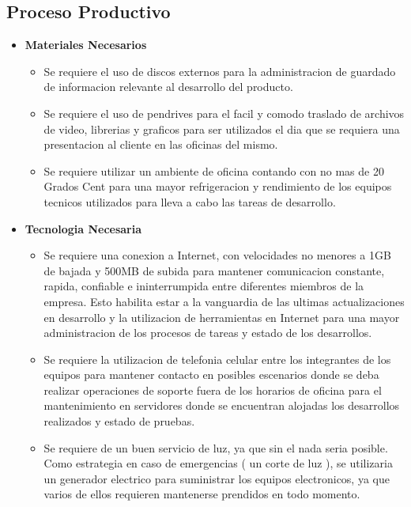 \documentclass[
10pt, %
a4paper, %
oneside, %
headinclude,footinclude, %
BCOR5mm, %
]{scrartcl}
\begin{document}
\subsection{Proceso Productivo}
\begin{itemize}
  \item \textbf {Materiales Necesarios}
  \begin{itemize}
    \item Se requiere el uso de discos externos para la administracion de
            guardado de informacion relevante al desarrollo del producto.
    \item Se requiere el uso de pendrives para el facil y comodo traslado
            de archivos de video, librerias y graficos para ser utilizados
            el dia que se requiera una presentacion al cliente en las oficinas
            del mismo.
    \item Se requiere utilizar un ambiente de oficina  contando con no mas
            de 20 Grados Cent para una mayor refrigeracion y rendimiento de los
            equipos tecnicos utilizados para lleva a cabo las tareas de desarrollo.
  \end{itemize}

  \item \textbf {Tecnologia Necesaria}
  \begin{itemize}
    \item Se requiere una conexion a Internet, con velocidades no menores a
            1GB de bajada y 500MB de subida para mantener comunicacion
            constante, rapida, confiable e ininterrumpida entre diferentes
            miembros de la empresa. Esto habilita estar a la vanguardia de las
            ultimas actualizaciones en desarrollo y la utilizacion de
            herramientas en Internet para una mayor administracion de los
            procesos de tareas y estado de los desarrollos.
    \item Se requiere la utilizacion de telefonia celular entre los integrantes
            de los equipos para mantener contacto en posibles escenarios donde
            se deba realizar operaciones de soporte fuera de los horarios de
            oficina para el mantenimiento en servidores donde se encuentran
            alojadas los desarrollos realizados y estado de pruebas.

    \item Se requiere de un buen servicio de luz, ya que sin el nada seria
            posible. Como estrategia en caso de emergencias ( un corte de luz ),
            se utilizaria un generador electrico para suministrar los
            equipos electronicos, ya que varios de ellos requieren mantenerse
            prendidos en todo momento.
  \end{itemize}


\end{itemize}
\end{document}
